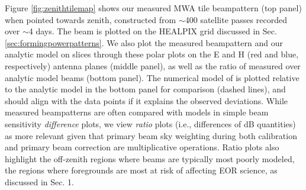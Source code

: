 Figure \ref{fig:zenithtilemap} shows our measured MWA tile beampattern (top panel) when pointed towards zenith, constructed from $\sim$400 satellite passes recorded over $\sim$4 days. The beam is plotted on the HEALPIX grid discussed in Sec. \ref{sec:formingpowerpatterns}. We also plot the measured beampattern and our analytic model on slices through these polar plots on the E and H (red and blue, respectively) antenna planes (middle panel), as well as the ratio of measured over analytic model beams (bottom panel). The numerical model of \citet{sutinjo2015} is plotted relative to the analytic model in the bottom panel for comparison (dashed lines), and should align with the data points if it explains the observed deviations. While measured beampatterns are often compared with models in simple beam sensitivity \textit{difference} plots, we view \textit{ratio} plots (i.e., differences of dB quantities) as more relevant given that primary beam sky weighting during both calibration and primary beam correction are multiplicative operations. Ratio plots also highlight the off-zenith regions where beams are typically most poorly modeled, the regions where foregrounds are most at risk of affecting EOR science, as discussed in Sec. 1.


